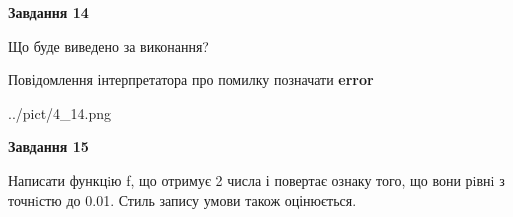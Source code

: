 \documentclass[11pt, ukrainian]{article}
\begin{document}
{\begin {large}
{\begin {center}\textbf{Завдання 14}\end {center}}\par
Що буде виведено за виконання? \par
Повідомлення інтерпретатора про помилку позначати \textbf{error}

\begin{center}
	{../pict/4_14.png}
\end{center}
\newpage

{\begin {center}\textbf{Завдання 15}\end {center}}\par

Написати функцiю f, що отримує 2 числа і повертає ознаку того, що вони рiвнi з точнiстю до 0.01. Стиль запису умови також оцінюється.\par
\newpage

\end {large}}
\end{document}
